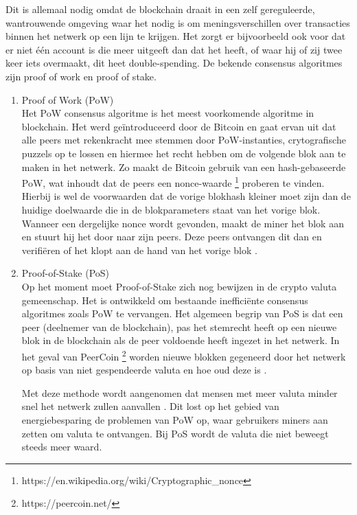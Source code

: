 Dit is allemaal nodig omdat de blockchain draait in een zelf gereguleerde, wantrouwende omgeving waar het nodig is om meningsverschillen over transacties binnen het netwerk op een lijn te krijgen. Het zorgt er bijvoorbeeld ook voor dat er niet één account is die meer uitgeeft dan dat het heeft, of waar hij of zij twee keer iets overmaakt, dit heet double-spending. De bekende consensus algoritmes zijn proof of work en proof of stake.\par

\begin{enumerate}
	\item Proof of Work (PoW)\\
	Het PoW consensus algoritme is het meest voorkomende algoritme in blockchain. Het werd geïntroduceerd door de Bitcoin en gaat ervan uit dat alle peers met rekenkracht mee stemmen door PoW-instanties, crytografische puzzels op te lossen en hiermee het recht hebben om de volgende blok aan te maken in het netwerk. Zo maakt de Bitcoin gebruik van een hash-gebaseerde PoW, wat inhoudt dat de peers een nonce-waarde \footnote{https://en.wikipedia.org/wiki/Cryptographic_nonce} proberen te vinden. Hierbij is wel de voorwaarden dat de vorige blokhash kleiner moet zijn dan de huidige doelwaarde die in de blokparameters staat van het vorige blok. Wanneer een dergelijke nonce wordt gevonden, maakt de miner het blok aan en stuurt hij het door naar zijn peers. Deze peers ontvangen dit dan en verifiëren of het klopt aan de hand van het vorige blok \cite{securityPOW}.
	\item Proof-of-Stake (PoS)\\
	Op het moment moet Proof-of-Stake zich nog bewijzen in de crypto valuta gemeenschap. Het is ontwikkeld om bestaande inefficiënte consensus algoritmes zoals PoW te vervangen. Het algemeen begrip van PoS is dat een peer (deelnemer van de blockchain), pas het stemrecht heeft op een nieuwe blok in de blockchain als de peer voldoende heeft ingezet in het netwerk. In het geval van PeerCoin \footnote{https://peercoin.net/} worden nieuwe blokken gegeneerd door het netwerk op basis van niet gespendeerde valuta en hoe oud deze is \cite{posProtocol}.\par
	
	Met deze methode wordt aangenomen dat mensen met meer valuta minder snel het netwerk zullen aanvallen \cite{blockchainIssuesAndChallenges}. Dit lost op het gebied van energiebesparing de problemen van PoW op, waar gebruikers miners aan zetten om valuta te ontvangen. Bij PoS wordt de valuta die niet beweegt steeds meer waard.
\end{enumerate}

